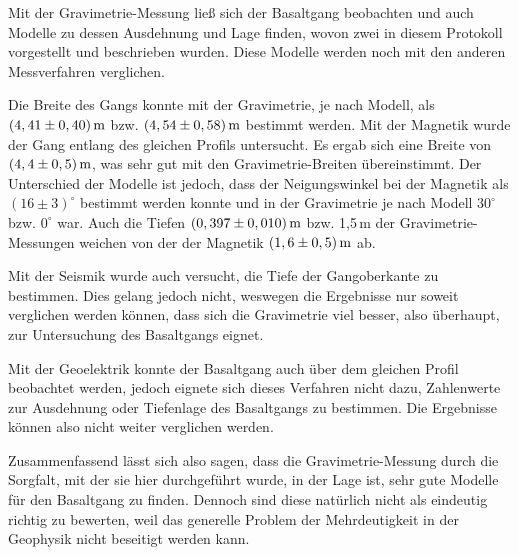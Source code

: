 Mit der Gravimetrie-Messung ließ sich der Basaltgang beobachten und auch Modelle zu dessen Ausdehnung und Lage finden, wovon zwei in diesem Protokoll vorgestellt und beschrieben wurden. Diese Modelle werden noch mit den anderen Messverfahren verglichen.

Die Breite des Gangs konnte mit der Gravimetrie, je nach Modell, als $(4,41\pm0,40)\,\mathrm{m}$ bzw. $(4,54\pm0,58)\,\mathrm{m}$ bestimmt werden. Mit der Magnetik wurde der Gang entlang des gleichen Profils untersucht. Es ergab sich eine Breite von $(4,4\pm0,5)\,\mathrm{m}$, was sehr gut mit den Gravimetrie-Breiten übereinstimmt. Der Unterschied der Modelle ist jedoch, dass der Neigungswinkel bei der Magnetik als $(16\pm3)^\circ$ bestimmt werden konnte und in der Gravimetrie je nach Modell $30^\circ$ bzw. $0^\circ$ war. Auch die Tiefen $(0,397\pm0,010)\,\mathrm{m}$ bzw. 1,5\,m der Gravimetrie-Messungen weichen von der der Magnetik $(1,6\pm0,5)\,\mathrm{m}$ ab.

Mit der Seismik wurde auch versucht, die Tiefe der Gangoberkante zu bestimmen. Dies gelang jedoch nicht, weswegen die Ergebnisse nur soweit verglichen werden können, dass sich die Gravimetrie viel besser, also überhaupt, zur Untersuchung des Basaltgangs eignet.

Mit der Geoelektrik konnte der Basaltgang auch über dem gleichen Profil beobachtet werden, jedoch eignete sich dieses Verfahren nicht dazu, Zahlenwerte zur Ausdehnung oder Tiefenlage des Basaltgangs zu bestimmen. Die Ergebnisse können also nicht weiter verglichen werden.

Zusammenfassend lässt sich also sagen, dass die Gravimetrie-Messung durch die Sorgfalt, mit der sie hier durchgeführt wurde, in der Lage ist, sehr gute Modelle für den Basaltgang zu finden. Dennoch sind diese natürlich nicht als eindeutig richtig zu bewerten, weil das generelle Problem der Mehrdeutigkeit in der Geophysik nicht beseitigt werden kann. 